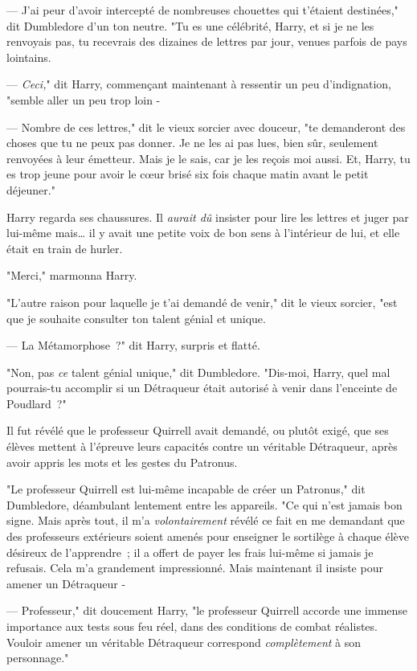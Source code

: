 --- J'ai peur d'avoir intercepté de nombreuses chouettes qui t'étaient destinées," dit Dumbledore d'un ton neutre. "Tu es une célébrité, Harry, et si je ne les renvoyais pas, tu recevrais des dizaines de lettres par jour, venues parfois de pays lointains.

--- \emph{Ceci,}" dit Harry, commençant maintenant à ressentir un peu d'indignation, "semble aller un peu trop loin -

--- Nombre de ces lettres," dit le vieux sorcier avec douceur, "te demanderont des choses que tu ne peux pas donner. Je ne les ai pas lues, bien sûr, seulement renvoyées à leur émetteur. Mais je le sais, car je les reçois moi aussi. Et, Harry, tu es trop jeune pour avoir le cœur brisé six fois chaque matin avant le petit déjeuner."

Harry regarda ses chaussures. Il \emph{aurait dû} insister pour lire les lettres et juger par lui-même mais… il y avait une petite voix de bon sens à l'intérieur de lui, et elle était en train de hurler.

"Merci," marmonna Harry.

"L'autre raison pour laquelle je t'ai demandé de venir," dit le vieux sorcier, "est que je souhaite consulter ton talent génial et unique.

--- La Métamorphose~?" dit Harry, surpris et flatté.

"Non, pas \emph{ce} talent génial unique," dit Dumbledore. "Dis-moi, Harry, quel mal pourrais-tu accomplir si un Détraqueur était autorisé à venir dans l'enceinte de Poudlard~?"

\later

Il fut révélé que le professeur Quirrell avait demandé, ou plutôt exigé, que ses élèves mettent à l'épreuve leurs capacités contre un véritable Détraqueur, après avoir appris les mots et les gestes du Patronus.

"Le professeur Quirrell est lui-même incapable de créer un Patronus," dit Dumbledore, déambulant lentement entre les appareils. "Ce qui n'est jamais bon signe. Mais après tout, il m'a \emph{volontairement} révélé ce fait en me demandant que des professeurs extérieurs soient amenés pour enseigner le sortilège à chaque élève désireux de l'apprendre~; il a offert de payer les frais lui-même si jamais je refusais. Cela m'a grandement impressionné. Mais maintenant il insiste pour amener un Détraqueur -

--- Professeur," dit doucement Harry, "le professeur Quirrell accorde une immense importance aux tests sous feu réel, dans des conditions de combat réalistes. Vouloir amener un véritable Détraqueur correspond \emph{complètement} à son personnage."

